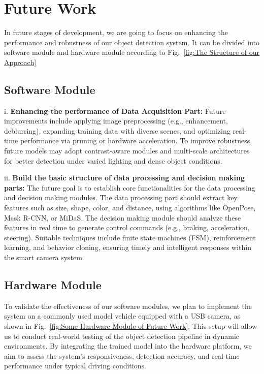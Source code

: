 \documentclass[journal,transmag]{IEEEtran}
\begin{document}
\section{Future Work}

In future stages of development, we are going to focus on enhancing the performance and robustness of our object detection system. It can be divided into software module and hardware module according to Fig.~\ref{fig:The Structure of our Approach}

\subsection{Software Module}

i. \textbf{Enhancing the performance of Data Acquisition Part: }Future improvements include applying image preprocessing (e.g., enhancement, deblurring), expanding training data with diverse scenes, and optimizing real-time performance via pruning or hardware acceleration. To improve robustness, future models may adopt contrast-aware modules and multi-scale architectures for better detection under varied lighting and dense object conditions.



ii. \textbf{Build the basic structure of data processing and decision making parts: }The future goal is to establish core functionalities for the data processing and decision making modules. The data processing part should extract key features such as size, shape, color, and distance, using algorithms like OpenPose, Mask R-CNN, or MiDaS. The decision making module should analyze these features in real time to generate control commands (e.g., braking, acceleration, steering). Suitable techniques include finite state machines (FSM), reinforcement learning, and behavior cloning, ensuring timely and intelligent responses within the smart camera system.


\subsection{Hardware Module}

To validate the effectiveness of our software modules, we plan to implement the system on a commonly used model vehicle equipped with a USB camera, as shown in Fig.~\ref{fig:Some Hardware Module of Future Work}. This setup will allow us to conduct real-world testing of the object detection pipeline in dynamic environments. By integrating the trained model into the hardware platform, we aim to assess the system’s responsiveness, detection accuracy, and real-time performance under typical driving conditions.
\end{document}
